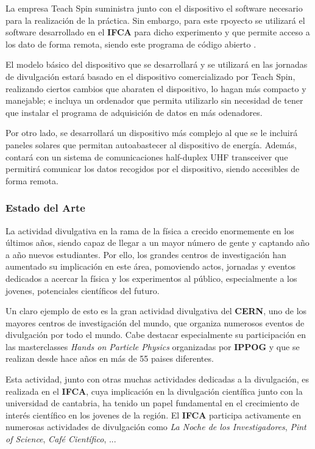 \documentclass[11pt]{extarticle}
\begin{document}
					La empresa Teach Spin suministra junto con el dispositivo el software necesario para la realización de la práctica. Sin embargo, para este rpoyecto se utilizará el software desarrollado en el \textbf{IFCA} para dicho experimento y que permite acceso a los dato de forma remota, siendo este programa de código abierto \cite{MULTIDAQ}.

					El modelo básico del dispositivo que se desarrollará y se utilizará en las jornadas de divulgación estará basado en el dispositivo comercializado por Teach Spin, realizando ciertos cambios que abaraten el dispositivo, lo hagan más compacto y manejable; e incluya un ordenador que permita utilizarlo sin necesidad de tener que instalar el programa de adquisición de datos en más odenadores.

					Por otro lado, se desarrollará un dispositivo más complejo al que se le incluirá paneles solares que permitan autoabastecer al dispositivo de energía. Además, contará con un sistema de comunicaciones half-duplex UHF transceiver que permitirá comunicar los datos recogidos por el dispositivo, siendo accesibles de forma remota. 

				\subsubsection{Estado del Arte}
					\label{SubSubSec:PreGeneral:ConcpMet:StatArt}

					La actividad divulgativa en la rama de la física a crecido enormemente en los últimos años, siendo capaz de llegar a un mayor número de gente y captando año a año nuevos estudiantes. Por ello, los grandes centros de investigación han aumentado su implicación en este área, pomoviendo actos, jornadas y eventos dedicados a acercar la física y los experimentos al público, especialmente a los jovenes, potenciales científicos del futuro.

					Un claro ejemplo de esto es la gran actividad divulgativa del \textbf{CERN}, uno de los mayores centros de investigación del mundo, que organiza numerosos eventos de divulgación por todo el mundo. Cabe destacar especialmente su participación en las masterclasses \textit{Hands on Particle Physics} organizadas por \textbf{IPPOG} y que se realizan desde hace años en más de 55 paises diferentes.

					Esta actividad, junto con otras muchas actividades dedicadas a la divulgación, es realizada en el \textbf{IFCA}, cuya implicación en la divulgación científica junto con la universidad de cantabria, ha tenido un papel fundamental en el crecimiento de interés científico en los jovenes de la región. El \textbf{IFCA} participa activamente en numerosas actividades de divulgación como \textit{La Noche de los Investigadores}, \textit{Pint of Science}, \textit{Café Científico}, ...
\end{document}
